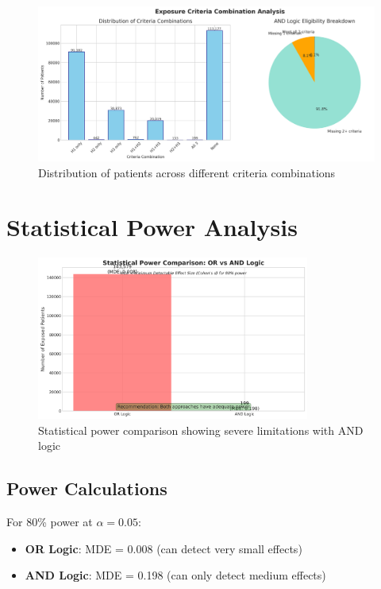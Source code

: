 \documentclass[11pt]{article}
\begin{document}
\begin{figure}[H]
\centering
\includegraphics[width=\textwidth]{analysis/combined_validation_results/criteria_combination_analysis.png}
\caption{Distribution of patients across different criteria combinations}
\label{fig:combinations}
\end{figure}

\section{Statistical Power Analysis}

\begin{figure}[H]
\centering
\includegraphics[width=0.8\textwidth]{analysis/exposure_validation_enhanced/power_analysis_comparison.png}
\caption{Statistical power comparison showing severe limitations with AND logic}
\label{fig:power}
\end{figure}

\subsection{Power Calculations}

For 80\% power at $\alpha = 0.05$:
\begin{itemize}
    \item \textbf{OR Logic}: MDE = 0.008 (can detect very small effects)
    \item \textbf{AND Logic}: MDE = 0.198 (can only detect medium effects)
\end{itemize}
\end{document}
